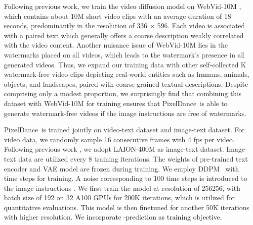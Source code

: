 \documentclass[10pt,twocolumn,letterpaper]{article}
\newcommand{\tcb}{\textcolor{black}}
\newcommand{\ours}{{PixelDance}}
\begin{document}
Following previous work, we train the video diffusion model on WebVid-10M \cite{bain2021WEBVID}, which contains about 10M short video clips with an average duration of 18 seconds, predominantly in the resolution of 336 × 596. Each video is associated with a paired text which generally offers a coarse description weakly correlated with the video content. Another nuisance issue of WebVid-10M lies in the watermarks placed on all videos, which leads to the watermark's presence in all generated videos. Thus, we expand our training data with other self-collected K watermark-free video clips depicting real-world entities such as humans, animals, objects, and landscapes, paired with coarse-grained textual descriptions. Despite comprising only a modest proportion, we surprisingly find that combining this dataset with WebVid-10M for training ensures that \ours~is able to generate watermark-free videos if the image instructions are free of watermarks. 


\ours~is trained jointly on video-text dataset and image-text dataset. For video data, we randomly sample 16 consecutive frames with 4 fps per video. Following previous work \cite{ho2022imagenvideo}, we adopt LAION-400M \cite{schuhmann2021laion} as image-text dataset. Image-text data are utilized every 8 training iterations. The weights of pre-trained text encoder and VAE model are frozen during training. We employ DDPM~\cite{ho2020ddpm} with  time steps for training. A noise corresponding to 100 time steps is introduced to the image instructions . We first train the model at resolution of 256256, with batch size of 192 on 32 A100 GPUs for 200K iterations, which is utilized for quantitative evaluations. This model is then finetuned for another 50K iterations with higher resolution.  \tcb{We incorporate -prediction \cite{ho2020ddpm} as training objective.}
\end{document}
